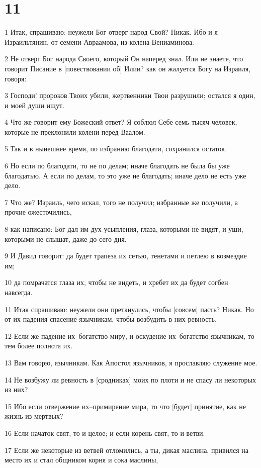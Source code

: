\chapter{11}

\par 1 Итак, спрашиваю: неужели Бог отверг народ Свой? Никак. Ибо и я Израильтянин, от семени Авраамова, из колена Вениаминова.
\par 2 Не отверг Бог народа Своего, который Он наперед знал. Или не знаете, что говорит Писание в [повествовании об] Илии? как он жалуется Богу на Израиля, говоря:
\par 3 Господи! пророков Твоих убили, жертвенники Твои разрушили; остался я один, и моей души ищут.
\par 4 Что же говорит ему Божеский ответ? Я соблюл Себе семь тысяч человек, которые не преклонили колени перед Ваалом.
\par 5 Так и в нынешнее время, по избранию благодати, сохранился остаток.
\par 6 Но если по благодати, то не по делам; иначе благодать не была бы уже благодатью. А если по делам, то это уже не благодать; иначе дело не есть уже дело.
\par 7 Что же? Израиль, чего искал, того не получил; избранные же получили, а прочие ожесточились,
\par 8 как написано: Бог дал им дух усыпления, глаза, которыми не видят, и уши, которыми не слышат, даже до сего дня.
\par 9 И Давид говорит: да будет трапеза их сетью, тенетами и петлею в возмездие им;
\par 10 да помрачатся глаза их, чтобы не видеть, и хребет их да будет согбен навсегда.
\par 11 Итак спрашиваю: неужели они преткнулись, чтобы [совсем] пасть? Никак. Но от их падения спасение язычникам, чтобы возбудить в них ревность.
\par 12 Если же падение их--богатство миру, и оскудение их--богатство язычникам, то тем более полнота их.
\par 13 Вам говорю, язычникам. Как Апостол язычников, я прославляю служение мое.
\par 14 Не возбужу ли ревность в [сродниках] моих по плоти и не спасу ли некоторых из них?
\par 15 Ибо если отвержение их--примирение мира, то что [будет] принятие, как не жизнь из мертвых?
\par 16 Если начаток свят, то и целое; и если корень свят, то и ветви.
\par 17 Если же некоторые из ветвей отломились, а ты, дикая маслина, привился на место их и стал общником корня и сока маслины,
